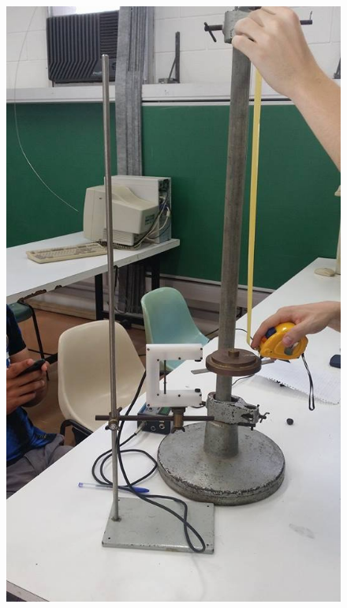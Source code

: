 \documentclass[12pt,a4paper]{article}
\begin{document}
\begin{figure}[!htbp]
	\centering
	\includegraphics[scale=0.30]{01.jpg}

\end{figure}
\end{document}
